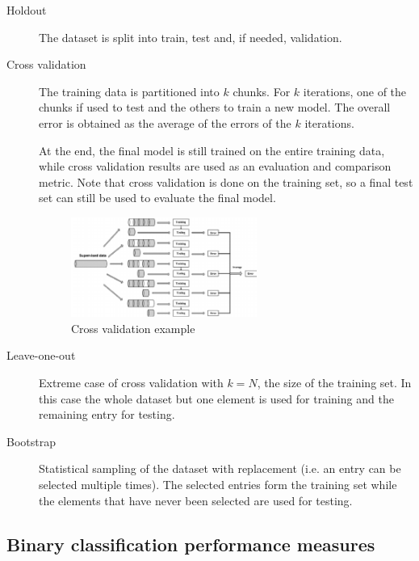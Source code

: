\begin{description}
    \item[Holdout] 
        The dataset is split into train, test and, if needed, validation.

    \item[Cross validation] 
        The training data is partitioned into $k$ chunks.
        For $k$ iterations, one of the chunks if used to test and the others to train a new model.
        The overall error is obtained as the average of the errors of the $k$ iterations.

        At the end, the final model is still trained on the entire training data, 
        while cross validation results are used as an evaluation and comparison metric.
        Note that cross validation is done on the training set, so a final test set can still be used to
        evaluate the final model.

        \begin{figure}[h]
            \centering
            \includegraphics[width=0.6\textwidth]{img/cross_validation.png}
            \caption{Cross validation example}
        \end{figure}

    \item[Leave-one-out] 
        Extreme case of cross validation with $k=N$, the size of the training set.
        In this case the whole dataset but one element is used for training and the remaining entry for testing.

    \item[Bootstrap] 
        Statistical sampling of the dataset with replacement (i.e. an entry can be selected multiple times).
        The selected entries form the training set while the elements that have never been selected are used for testing.
\end{description}


\subsection{Binary classification performance measures}

